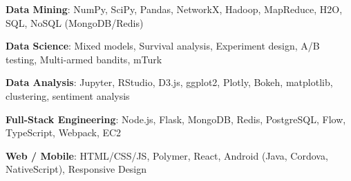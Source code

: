 \documentclass[margin,line]{resume}
\begin{document}
\begin{resume}
\textbf{Data Mining}: NumPy, SciPy, Pandas, NetworkX, Hadoop, MapReduce, H2O, SQL, NoSQL (MongoDB/Redis) %

\vspace{-4mm}

\textbf{Data Science}: Mixed models, Survival analysis, Experiment design, A/B testing, Multi-armed bandits, mTurk %

\vspace{-4mm}

\textbf{Data Analysis}: Jupyter, RStudio, D3.js, ggplot2, Plotly, Bokeh, matplotlib, clustering, sentiment analysis %



\vspace{-4mm}


\textbf{Full-Stack Engineering}: Node.js, Flask, MongoDB, Redis, PostgreSQL, Flow, TypeScript, Webpack, EC2 %








\vspace{-4mm}

\textbf{Web / Mobile}: HTML/CSS/JS, Polymer, React, Android (Java, Cordova, NativeScript), Responsive Design


\end{resume}
\end{document}
